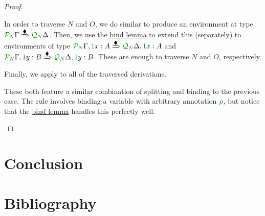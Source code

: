 \documentclass[submission,copyright,creativecommons]{eptcs}
\begin{document}
\begin{proof}
\begin{description}
      In order to traverse $N$ and $O$, we do similar to produce an environment
      at type
      $\ctx{\Gamma}{P_{\mathnormal N}}
      \subst{\kitrel} \ctx{\Delta}{Q_{\mathnormal N}}$.
      Then, we use the \hyperref[lem:bind]{bind lemma} to extend this
      (separately) to environments of type
      $\ctx{\Gamma}{P_{\mathnormal N}}, \ctxvar{x}{A}{1}
      \subst{\kitrel} \ctx{\Delta}{Q_{\mathnormal N}}, \ctxvar{x}{A}{1}$ and
      $\ctx{\Gamma}{P_{\mathnormal N}}, \ctxvar{y}{B}{1}
      \subst{\kitrel} \ctx{\Delta}{Q_{\mathnormal N}}, \ctxvar{y}{B}{1}$.
      These are enough to traverse $N$ and $O$, respectively.

      Finally, we apply  to all of the traversed
      derivations.
    \item[\TirName{$\tensor{}{}$-E}, \TirName{$\excl{\rho}{}$-E}:]
      These both feature a similar combination of splitting and binding to the
      previous case.
      The  rule involves binding a variable with
      arbitrary annotation $\rescomment\rho$, but notice that the
      \hyperref[lem:bind]{bind lemma} handles this perfectly well.
  \end{description}
\end{proof}

\section{Conclusion}\label{sec:conclusion}

\section{Bibliography}



\end{document}
